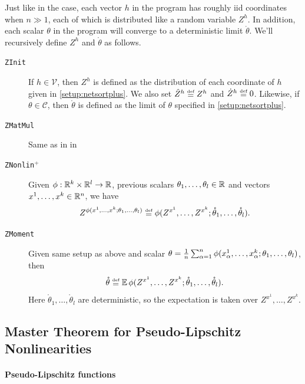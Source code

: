 \documentclass[main.tex]{subfiles}
\begin{document}
\begin{defn}
    \label{defn:netsortplusKeyIntuit}
 Just like in the \netsort{} case, each vector $h$ in the program has roughly iid coordinates when $n\gg1$, each of which is distributed like a random variable $Z^{h}$. In addition, each scalar $\theta$ in the program will converge to a deterministic limit $\mathring{\theta}$. We'll recursively define $Z^{h}$ and $\mathring{\theta}$ as follows.
\begin{description}
\item [\texttt{ZInit}]
If $h\in\mathcal{V}$, then $Z^{h}$ is defined as the distribution of each coordinate of $h$ given in \cref{setup:netsortplus}. We also set $\hat{Z}^{h}\defeq Z^{h}$ and $\Zdot^{h}\defeq 0$.
  Likewise, if $\theta\in\mathcal{C}$, then $\mathring{\theta}$ is defined as the limit of $\theta$ specified in \cref{setup:netsortplus}.
\item [\texttt{ZMatMul}] Same as in  in \netsort{}
\item [\texttt{ZNonlin$^+$}] Given $\phi:\mathbb{R}^{k}\times\mathbb{R}^{l}\to\mathbb{R}$, previous scalars $\theta_{1},\ldots,\theta_{l}\in\mathbb{R}$ and vectors $x^{1},\ldots,x^{k}\in\mathbb{R}^{n}$, we have
\[
Z^{\phi(x^{1},\ldots,x^{k};\theta_{1},\ldots,\theta_{l})}\defeq\phi(Z^{x^{1}},\ldots,Z^{x^{k}};\mathring{\theta}_{1},\ldots,\mathring{\theta}_{l}).
\]
\item [\texttt{ZMoment}] Given same setup as above and scalar $\theta = \frac{1}{n}\sum_{\alpha=1}^{n}\phi(x_{\alpha}^{1},\ldots,x_{\alpha}^{k};\theta_{1},\ldots,\theta_{l})$, then
\[
\mathring{\theta}\defeq\EV\phi(Z^{x^{1}},\ldots,Z^{x^{k}};\mathring{\theta}_{1},\ldots,\mathring{\theta}_{l}).
\]
Here $\mathring{\theta}_{1},\ldots,\mathring{\theta}_{l}$ are deterministic, so the expectation is taken over $Z^{x^{1}},\ldots,Z^{x^{k}}$.
\end{description}
\end{defn}

\subsection{\netsortplus{} Master Theorem for Pseudo-Lipschitz Nonlinearities}
\paragraph{Pseudo-Lipschitz functions}
\end{document}
